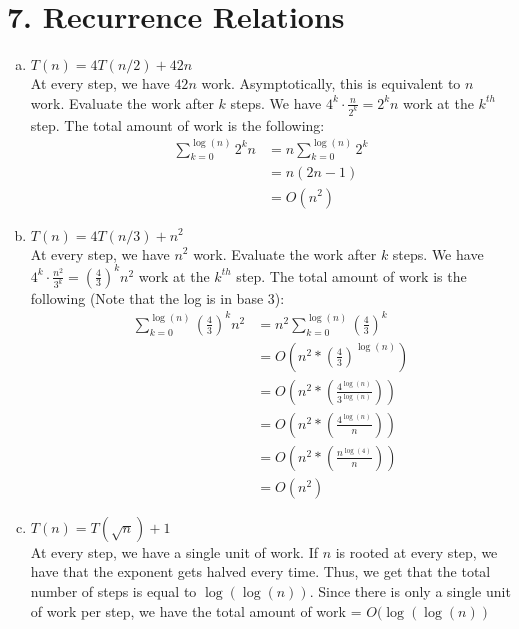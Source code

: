 \documentclass[a4paper]{article}
\newcommand{\<}{\langle}
\renewcommand{\>}{\rangle}
\renewcommand{\^}{\wedge}
\begin{document}
\section{7. Recurrence Relations}
\begin{enumerate} [a)]
    \item $T(n) = 4T(n/2) + 42n$\\
    At every step, we have $42n$ work. Asymptotically, this is equivalent to $n$ work. Evaluate the work after $k$ steps. We have $4^k \cdot \frac{n}{2^k} = 2^kn$ work at the $k^{th}$ step. The total amount of work is the following:
    \begin{align*}
        \sum_{k=0}^{\log(n)}2^kn &= n\sum_{k=0}^{\log(n)}2^k\\
        &= n(2n-1)\\
        &= O(n^2)
    \end{align*}
    \item $T(n) = 4T(n/3) + n^2$\\
    At every step, we have $n^2$ work. Evaluate the work after $k$ steps. We have $4^k \cdot \frac{n^2}{3^k} = (\frac{4}{3})^kn^2$ work at the $k^{th}$ step. The total amount of work is the following (Note that the log is in base 3):
    \begin{align*}
        \sum_{k=0}^{\log(n)}(\frac{4}{3})^kn^2 &= n^2\sum_{k=0}^{\log(n)}(\frac{4}{3})^k\\
        &= O(n^2 * (\frac{4}{3})^{\log(n)})\\
        &= O(n^2 * (\frac{4^{\log(n)}}{3^{\log(n)}}))\\
        &= O(n^2 * (\frac{4^{\log(n)}}{n}))\\
        &= O(n^2 * (\frac{n^{\log(4)}}{n}))\\
        &= O(n^2)
    \end{align*}
    \item $T(n) = T(\sqrt{n}) + 1$\\
    At every step, we have a single unit of work. If $n$ is rooted at every step, we have that the exponent gets halved every time. Thus, we get that the total number of steps is equal to $\log(\log(n))$. Since there is only a single unit of work per step, we have the total amount of work = $O(\log(\log(n))$
\end{enumerate}
\newpage
\end{document}

